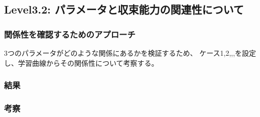 \subsection{Level3.2: パラメータと収束能力の関連性について}
\subsubsection{関係性を確認するためのアプローチ}
3つのパラメータがどのような関係にあるかを検証するため、
ケース1,2,,,を設定し、学習曲線からその関係性について考察する。

\subsubsection{結果}

\subsubsection{考察}

